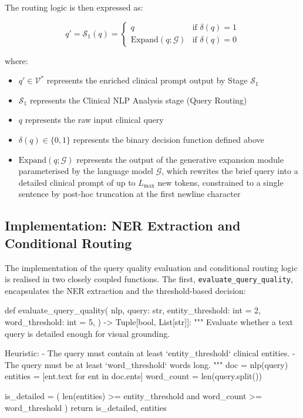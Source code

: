 The routing logic is then expressed as:

$$
q' = \mathcal{S}_1(q) = \begin{cases} q & \text{if } \delta(q) = 1 \\ \text{Expand}(q; \mathcal{G}) & \text{if } \delta(q) = 0 \end{cases}
$$

where:
\begin{itemize}
\item $q' \in \mathcal{V}^*$ represents the enriched clinical prompt output by Stage $\mathcal{S}_1$
\item $\mathcal{S}_1$ represents the Clinical NLP Analysis stage (Query Routing)
\item $q$ represents the raw input clinical query
\item $\delta(q) \in \{0, 1\}$ represents the binary decision function defined above
\item $\text{Expand}(q; \mathcal{G})$ represents the output of the generative expansion module parameterised by the language model $\mathcal{G}$, which rewrites the brief query into a detailed clinical prompt of up to $L_{\max}$ new tokens, constrained to a single sentence by post-hoc truncation at the first newline character
\end{itemize}

\subsection{Implementation: NER Extraction and Conditional Routing}
\label{sec:3_2_4}

The implementation of the query quality evaluation and conditional routing logic is realised in two closely coupled functions. The first, \texttt{evaluate\_query\_quality}, encapsulates the NER extraction and the threshold-based decision:

\begin{pythoncode}
def evaluate_query_quality(
    nlp,
    query: str,
    entity_threshold: int = 2,
    word_threshold: int = 5,
) -> Tuple[bool, List[str]]:
    """
    Evaluate whether a text query is detailed enough for visual grounding.

    Heuristic:
    - The query must contain at least `entity_threshold` clinical entities.
    - The query must be at least `word_threshold` words long.
    """
    doc = nlp(query)
    entities = [ent.text for ent in doc.ents]
    word_count = len(query.split())

    is_detailed = (
        len(entities) >= entity_threshold and word_count >= word_threshold
    )
    return is_detailed, entities
\end{pythoncode}

